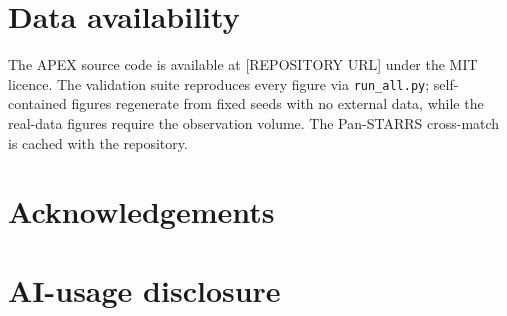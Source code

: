\documentclass[fleqn,usenatbib]{mnras}
\begin{document}
\section*{Data availability}
The APEX source code is available at [REPOSITORY URL] under the MIT licence. The validation suite reproduces every figure via \texttt{run\_all.py}; self-contained figures regenerate from fixed seeds with no external data, while the real-data figures require the observation volume. The Pan-STARRS cross-match is cached with the repository.

\section*{Acknowledgements}

\section*{AI-usage disclosure}




\bsp
\label{lastpage}
\end{document}
